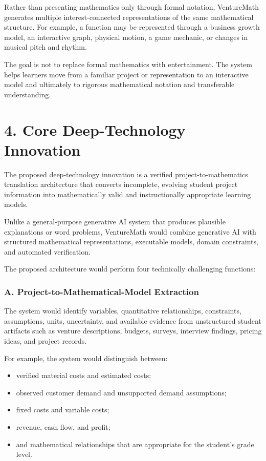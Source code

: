Rather than presenting mathematics only through formal notation, VentureMath generates multiple interest-connected representations of the same mathematical structure. For example, a function may be represented through a business growth model, an interactive graph, physical motion, a game mechanic, or changes in musical pitch and rhythm.

The goal is not to replace formal mathematics with entertainment. The system helps learners move from a familiar project or representation to an interactive model and ultimately to rigorous mathematical notation and transferable understanding.

\section{4. Core Deep-Technology Innovation}

The proposed deep-technology innovation is a verified project-to-mathematics translation architecture that converts incomplete, evolving student project information into mathematically valid and instructionally appropriate learning models.

Unlike a general-purpose generative AI system that produces plausible explanations or word problems, VentureMath would combine generative AI with structured mathematical representations, executable models, domain constraints, and automated verification.

The proposed architecture would perform four technically challenging functions:

\subsubsection{A. Project-to-Mathematical-Model Extraction}

The system would identify variables, quantitative relationships, constraints, assumptions, units, uncertainty, and available evidence from unstructured student artifacts such as venture descriptions, budgets, surveys, interview findings, pricing ideas, and project records.

For example, the system would distinguish between:

\begin{itemize}
    \item verified material costs and estimated costs;
\item observed customer demand and unsupported demand assumptions;
\item fixed costs and variable costs;
\item revenue, cash flow, and profit;
\item and mathematical relationships that are appropriate for the student’s grade level.
\end{itemize}

